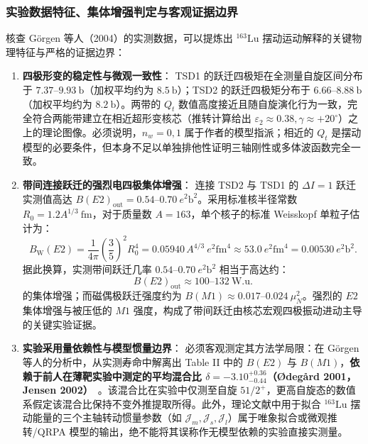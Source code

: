 \subsubsection{实验数据特征、集体增强判定与客观证据边界}

核查 Görgen 等人（2004）的实测数据，可以提炼出 $^{163}\mathrm{Lu}$ 摆动运动解释的关键物理特征与严格的证据边界：
\begin{enumerate}
\item \textbf{四极形变的稳定性与微观一致性}：
TSD1 的跃迁四极矩在全测量自旋区间分布于 $7.37$--$9.93\ \mathrm{b}$（加权平均约为 $8.5\ \mathrm{b}$）；TSD2 的跃迁四极矩分布于 $6.66$--$8.88\ \mathrm{b}$（加权平均约为 $8.2\ \mathrm{b}$）。两带的 $Q_t$ 数值高度接近且随自旋演化行为一致，完全符合两能带建立在相近超形变核芯（推转计算给出 $\varepsilon_2 \approx 0.38, \gamma \approx +20^\circ$）之上的理论图像。必须说明，$n_w = 0, 1$ 属于作者的模型指派；相近的 $Q_t$ 是摆动模型的必要条件，但本身不足以单独排他性证明三轴刚性或多体波函数完全一致。
\item \textbf{带间连接跃迁的强烈电四极集体增强}：
连接 TSD2 与 TSD1 的 $\Delta I = 1$ 跃迁实测值高达 $B(E2)_{\mathrm{out}} = 0.54$--$0.70\ e^2\mathrm{b}^2$。采用标准核半径常数 $R_0 = 1.2 A^{1/3}\ \mathrm{fm}$，对于质量数 $A=163$，单个核子的标准 Weisskopf 单粒子估计为：
\begin{equation}\label{eq:4-4-weisskopf-e2}
B_{\mathrm{W}}(E2) = \frac{1}{4\pi}\left(\frac{3}{5}\right)^2 R_0^4 = 0.05940\, A^{4/3}\ e^2\mathrm{fm}^4 \approx 53.0\ e^2\mathrm{fm}^4 = 0.00530\ e^2\mathrm{b}^2.
\end{equation}
据此换算，实测带间跃迁几率 $0.54$--$0.70\ e^2\mathrm{b}^2$ 相当于高达约：
\begin{equation}\label{eq:4-4-lu163-wu}
B(E2)_{\mathrm{out}} \approx 100\text{--}132\ \mathrm{W.u.}
\end{equation}
的集体增强；而磁偶极跃迁强度约为 $B(M1) \approx 0.017$--$0.024\ \mu_N^2$。强烈的 $E2$ 集体增强与被压低的 $M1$ 强度，构成了带间跃迁由核芯宏观四极振动进动主导的关键实验证据。
\item \textbf{实验采用量依赖性与模型惯量边界}：
必须客观测定其方法学局限：在 Görgen 等人的分析中，从实测寿命中解离出 Table II 中的 $B(E2)$ 与 $B(M1)$，\textbf{依赖于前人在薄靶实验中测定的平均混合比 $\delta = -3.10_{-0.44}^{+0.36}$（Ødegård 2001，Jensen 2002）}~\cite{odegard-2001-evidence-wobbling-163lu,jensen-2002-second-phonon-wobbling-163lu}。该混合比在实验中仅测至自旋 $51/2^+$，更高自旋态的数值系假定该混合比保持不变外推提取所得。此外，理论文献中用于拟合 $^{163}\mathrm{Lu}$ 摆动能量的三个主轴转动惯量参数（如 $\mathcal{J}_m, \mathcal{J}_s, \mathcal{J}_l$）属于唯象拟合或微观推转/QRPA 模型的输出，绝不能将其误称作无模型依赖的实验直接实测量。

\end{enumerate}
